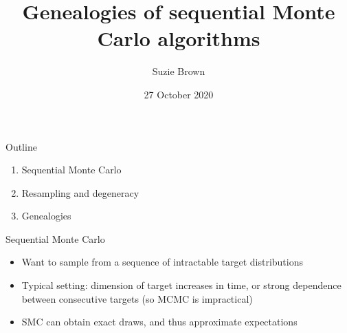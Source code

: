 \documentclass[aspectratio=169]{beamer}
\title[SMC genealogies]{Genealogies of sequential Monte Carlo algorithms}
\author{Suzie Brown}
\date{27 October 2020}
\theoremstyle{definition}
\begin{document}
\begin{frame}
\maketitle
\end{frame}


\begin{frame}{Outline}
\begin{enumerate}
\item Sequential Monte Carlo
\item Resampling and degeneracy
\item Genealogies
\end{enumerate}
\end{frame}


\begin{frame}{Sequential Monte Carlo}
\begin{itemize}
\item Want to sample from a sequence of intractable target distributions
\item Typical setting: dimension of target increases in time, or strong dependence between consecutive targets (so MCMC is impractical)
\item SMC can obtain exact draws, and thus approximate expectations
\end{itemize}


\end{frame}
\end{document}

